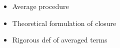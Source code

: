 \begin{itemize}
    \item Average procedure 
    \item Theoretical formulation of closure 
    \item Rigorous def of averaged terms 
\end{itemize}